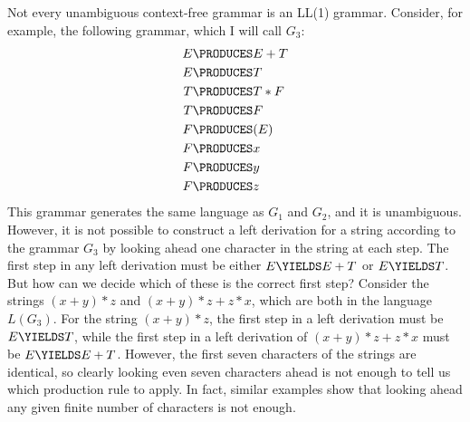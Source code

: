 Not every unambiguous context-free grammar is an LL(1) grammar.  Consider, for
example, the following grammar, which I will call $G_3$:
\begin{align*}
   E &\PRODUCES E + T\\
   E &\PRODUCES T\\
   T &\PRODUCES T*F\\
   T &\PRODUCES F\\
   F &\PRODUCES (E)\\
   F &\PRODUCES x\\
   F &\PRODUCES y\\
   F &\PRODUCES z
\end{align*}
This grammar generates the same language as $G_1$ and $G_2$,
and it is unambiguous.  However, it is not possible to construct
a left derivation for a string according to the grammar $G_3$ by
looking ahead one character in the string at each step.  
The first step in any left derivation must be either
$E\YIELDS E+T$ or $E\YIELDS T$.  But how can we decide which of
these is the correct first step?
Consider the strings $(x+y)*z$ and $(x+y)*z+z*x$, which are both
in the language $L(G_3)$.  For the string $(x+y)*z$, the
first step in a left derivation must be $E\YIELDS T$, while 
the first step in a left derivation of $(x+y)*z+z*x$ must be
$E\YIELDS E+T$.  However, the first seven characters of the strings
are identical, so clearly looking even seven characters ahead is not
enough to tell us which production rule to apply.  In fact,
similar examples show that looking ahead any given finite number of
characters is not enough.

